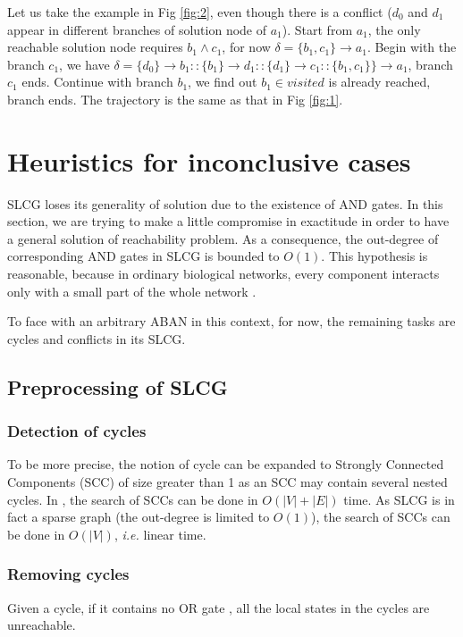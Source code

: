 \documentclass[runningheads]{llncs}
\newcommand{\acm}[3]{\{#1\}\rightarrow#3}
\begin{document}
Let us take the example in Fig \ref{fig:2}, even though there is a conflict ($d_0$ and $d_1$ appear in different branches of solution node of $a_1$). 
Start from $a_1$, the only reachable solution node requires $b_1\land c_1$, for now $\delta=\acm{b_1,c_1}{a_0}{a_1}$.
Begin with the branch $c_1$, we have $\delta=\acm{d_0}{b_0}{b_1}::\acm{b_1}{d_0}{d_1}::\acm{d_1}{c_0}{c_1}::\acm{b_1,c_1\}}{a_0}{a_1}$, branch $c_1$ ends. 
Continue with branch $b_1$, we find out $b_1\in visited$ is already reached, branch ends. 
The trajectory is the same as that in Fig \ref{fig:1}.



\section{Heuristics for inconclusive cases}\label{sect:4}
SLCG loses its generality of solution due to the existence of AND gates.
In this section, we are trying to make a little compromise in exactitude in order to have a general solution of reachability problem. 
As a consequence, the out-degree of corresponding AND gates in SLCG is bounded to $O (1)$.
This hypothesis is reasonable, because in ordinary biological networks, every component interacts only with a small part of the whole network \cite{akutsu2007control}.

To face with an arbitrary ABAN in this context, for now, the remaining tasks are cycles and conflicts in its SLCG.
\subsection{Preprocessing of SLCG}\label{sectprecond}
\subsubsection{Detection of cycles}
To be more precise, the notion of cycle can be expanded to Strongly Connected Components (SCC) of size greater than 1 as an SCC may contain several nested cycles. 
In \cite{tarjan1972}, the search of SCCs can be done in $O (|V|+|E|)$ time. 
As SLCG is in fact a sparse graph (the out-degree is limited to $O (1)$), the search of SCCs can be done in $O (|V|)$, \textit{i.e.} linear time.

\subsubsection{Removing cycles}
\begin{theorem}\label{cycletheo}
Given a cycle, if it contains no OR gate%
, all the local states in the cycles are unreachable.
\end{theorem}
\end{document}
